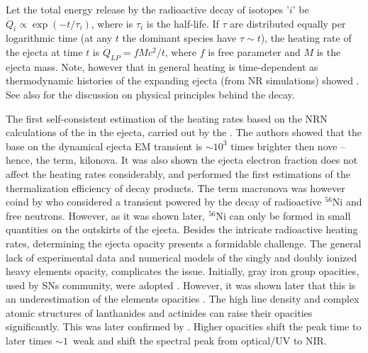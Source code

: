 Let the total energy release by the radioactive decay of isotopes '$i$' be 
$\dot{Q}_i \propto \exp(-t/\tau_i)$, where is $\tau_i$ is the half-life. If $\tau$ 
are distributed equally per logarithmic time (at any $t$ the dominant species have $\tau\sim t$), 
the heating rate of the ejecta at time $t$ is
%
$\dot{Q}_{LP} = f M c^2 / t$,
%
where $f$ is free parameter and $M$ is the ejecta mass.
%
Note, however that in general heating is time-dependent as thermodynamic histories of the expanding 
ejecta (from \ac{NR} simulations) showed \citep{Metzger:2010,Roberts:2011,Korobkin:2012uy}.
See also \citet{Hotokezaka:2017dbk} for the discussion on physical principles behind the decay.
%

The first self-consistent estimation of the heating rates based on the \ac{NRN} calculations 
of the \rproc{} in the ejecta, carried out by the \citet{Metzger:2010}. The authors showed that the base 
on the dynamical ejecta \ac{EM} transient is $\sim10^3$ times brighter then nove -- hence, the term, kilonova. 
It was also shown the ejecta electron fraction does not affect the heating rates considerably, 
and performed the first estimations of the thermalization efficiency of decay products. 
%
The term macronova was however coind by \citet{Kulkarni:2005jw} who considered a transient powered by the 
decay of radioactive $^{56}$Ni and free neutrons. However, as it was shown later, $^{56}$Ni can only be 
formed in small quantities on the outskirts of the ejecta.
%
Besides the intricate radioactive heating rates, determining the ejecta opacity presents a 
formidable challenge. The general lack of experimental data and numerical models of the singly 
and doubly ionized heavy \rproc{} elements opacity, complicates the issue. Initially, gray iron 
group opacities, used by \acp{SN} community, were adopted \citep{Roberts:2011}. However, it was 
shown later that this is an underestimation of the \rproc{} elements opacities \citep{Kasen:2013xka}. 
The high line density and complex atomic structures of lanthanides and actinides can raise their 
opacities significantly. This was later confirmed by \citep{Tanaka:2013ana}. Higher opacities shift 
the peak time to later times ${\sim}1$~weak \citep{Barnes:2013wka} 
and shift the spectral peak from optical/UV to \ac{NIR}.


